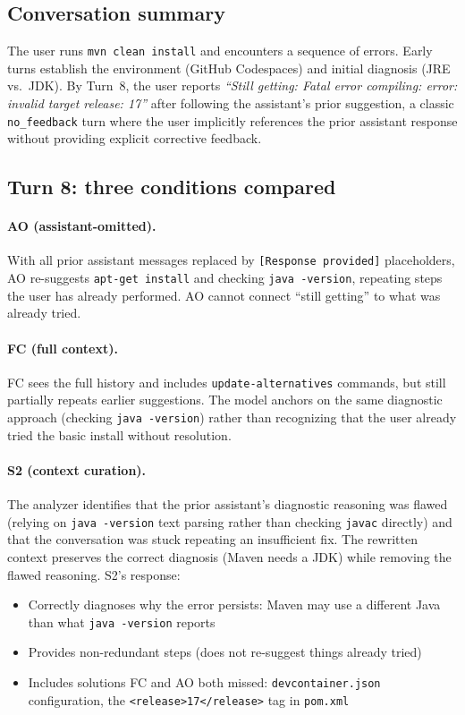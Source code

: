\documentclass{article}
\begin{document}
\subsection{Conversation summary}

The user runs \texttt{mvn clean install} and encounters a sequence of errors. Early turns establish the environment (GitHub Codespaces) and initial diagnosis (JRE vs.\ JDK). By Turn~8, the user reports \emph{``Still getting: Fatal error compiling: error: invalid target release: 17''} after following the assistant's prior suggestion, a classic \texttt{no\_feedback} turn where the user implicitly references the prior assistant response without providing explicit corrective feedback.

\subsection{Turn 8: three conditions compared}

\paragraph{AO (assistant-omitted).} With all prior assistant messages replaced by \texttt{[Response provided]} placeholders, AO re-suggests \texttt{apt-get install} and checking \texttt{java -version}, repeating steps the user has already performed. AO cannot connect ``still getting'' to what was already tried.

\paragraph{FC (full context).} FC sees the full history and includes \texttt{update-alternatives} commands, but still partially repeats earlier suggestions. The model anchors on the same diagnostic approach (checking \texttt{java -version}) rather than recognizing that the user already tried the basic install without resolution.

\paragraph{S2 (context curation).} The analyzer identifies that the prior assistant's diagnostic reasoning was flawed (relying on \texttt{java -version} text parsing rather than checking \texttt{javac} directly) and that the conversation was stuck repeating an insufficient fix. The rewritten context preserves the correct diagnosis (Maven needs a JDK) while removing the flawed reasoning. S2's response:
\begin{itemize}
    \item Correctly diagnoses why the error persists: Maven may use a different Java than what \texttt{java -version} reports
    \item Provides non-redundant steps (does not re-suggest things already tried)
    \item Includes solutions FC and AO both missed: \texttt{devcontainer.json} configuration, the \texttt{\textless release\textgreater 17\textless /release\textgreater} tag in \texttt{pom.xml}
\end{itemize}
\end{document}
